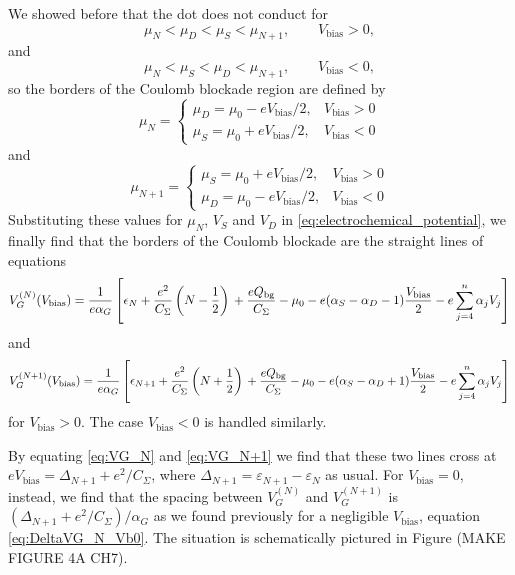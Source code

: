 \documentclass[a4paper,twoside,11pt]{book}
\begin{document}
We showed before that the dot does not conduct for
\begin{equation}
	 \mu_N < \mu_D < \mu_S < \mu_{N+1}, \qquad V_{\text{bias}} > 0,
\end{equation}
and
\begin{equation}
	 \mu_N < \mu_S < \mu_D < \mu_{N+1}, \qquad V_{\text{bias}} < 0,
\end{equation}
so the borders of the Coulomb blockade region are defined by
\begin{equation}
	\mu_N = 
	\begin{cases}
		\mu_D = \mu_0 - eV_{\text{bias}}/2, & V_{\text{bias}} > 0 \\
		\mu_S = \mu_0 + eV_{\text{bias}}/2, & V_{\text{bias}} < 0
	\end{cases}
\end{equation}
and
\begin{equation}
	\mu_{N+1} = 
	\begin{cases}
		\mu_S = \mu_0 + eV_{\text{bias}}/2, & V_{\text{bias}} > 0 \\
		\mu_D = \mu_0 - eV_{\text{bias}}/2, & V_{\text{bias}} < 0
	\end{cases}
\end{equation}
Substituting these values for $\mu_N$, $V_S$ and $V_D$ in \eqref{eq:electrochemical_potential}, we finally find that the borders of the Coulomb blockade are the straight lines of equations
\begin{dmath}
	V_G^{(N)}(V_{\text{bias}})
	= \frac{1}{e\alpha_G}\left[ \epsilon_N + \frac{e^2}{C_{\Sigma}}\left(N-\frac{1}{2}\right) \\
	+ \frac{eQ_{\text{bg}}}{C_{\Sigma}} - \mu_0 - e(\alpha_S-\alpha_D-1)\frac{V_{\text{bias}}}{2} - e\sum_{j=4}^{n}\alpha_jV_j \right]
	\label{eq:VG_N}
\end{dmath}
and
\begin{dmath}
	V_G^{(N+1)}(V_{\text{bias}})
	= \frac{1}{e\alpha_G}\left[ \epsilon_{N+1} + \frac{e^2}{C_{\Sigma}}\left(N+\frac{1}{2}\right) \\
	+ \frac{eQ_{\text{bg}}}{C_{\Sigma}} - \mu_0 - e(\alpha_S-\alpha_D+1)\frac{V_{\text{bias}}}{2} - e\sum_{j=4}^{n}\alpha_jV_j \right]
	\label{eq:VG_N+1}
\end{dmath}
for $V_{\text{bias}}>0$. The case $V_{\text{bias}}<0$ is handled similarly.

By equating \eqref{eq:VG_N} and \eqref{eq:VG_N+1} we find that these two lines cross at $eV_{\text{bias}} = \Delta_{N+1} + e^2/C_{\Sigma}$, where $\Delta_{N+1}=\varepsilon_{N+1}-\varepsilon_{N}$ as usual. For $V_{\text{bias}}=0$, instead, we find that the spacing between $V_G^{(N)}$ and $V_G^{(N+1)}$ is $(\Delta_{N+1} + e^2/C_{\Sigma})/\alpha_G$ as we found previously for a negligible $V_{\text{bias}}$, equation \eqref{eq:DeltaVG_N_Vb0}. The situation is schematically pictured in Figure (MAKE FIGURE 4A CH7).
\end{document}
